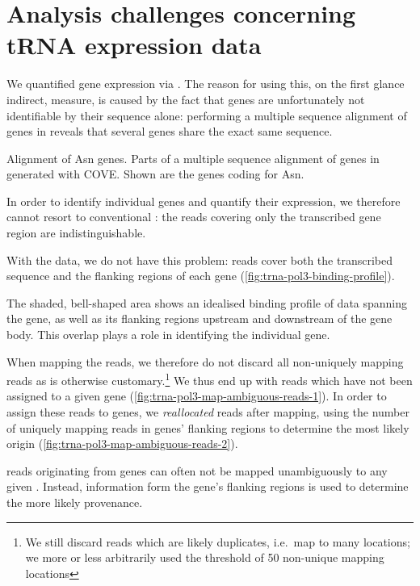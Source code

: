 \chapter{Analysis challenges concerning tRNA expression data}

We quantified \trna gene expression via  \chipseq. The reason for using
this, on the first glance indirect, measure, is caused by the fact that \trna
genes are unfortunately not identifiable by their sequence alone: performing a
multiple sequence alignment of \trna genes in \mmu reveals that several \trna
genes share the exact same sequence.

    {{\footnotesize}}
    {Alignment of Asn \trna genes.}
    {Parts of a multiple sequence alignment of \trna genes in \mmu generated
    with COVE\@. Shown are the \trna genes coding for Asn.}

In order to identify individual \trna genes and quantify their expression, we
therefore cannot resort to conventional \rnaseq: the \rna reads covering only
the transcribed gene region are indistinguishable.

With the  \chipseq data, we do not have this problem: reads cover both the
transcribed sequence and the flanking regions of each gene
(\cref{fig:trna-pol3-binding-profile}).

    {The shaded, bell-shaped area shows an idealised binding profile of \chipseq
    data spanning the \trna gene, as well as its flanking regions upstream
    and downstream of the gene body. This overlap plays a role in identifying
    the individual gene.}

When mapping the reads, we therefore do not discard all non-uniquely mapping
reads as is otherwise customary.\footnote{We still discard reads which are
likely \pcr duplicates, i.e.\ map to many locations; we more or less arbitrarily
used the threshold of \num{50} non-unique mapping locations} We thus end up with
reads which have not been assigned to a given \trna gene
(\cref{fig:trna-pol3-map-ambiguous-reads-1}). In order to assign these reads to
\trna genes, we \emph{reallocated} reads after mapping, using the number of
uniquely mapping reads in \trna genes’ flanking regions to determine the most
likely origin (\cref{fig:trna-pol3-map-ambiguous-reads-2}).

    {\chip reads originating from \trna genes can often not be mapped
    unambiguously to any given \trna. Instead, information form the gene’s
    flanking regions is used to determine the more likely provenance.}


